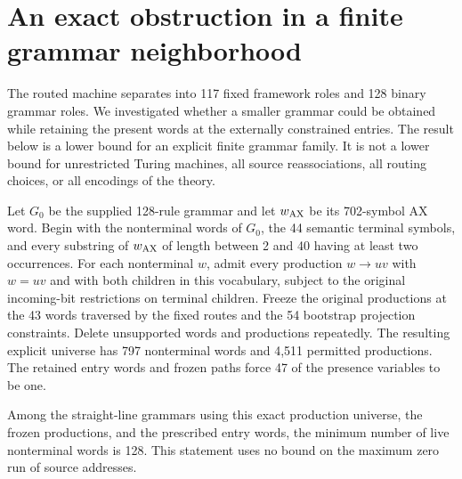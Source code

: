 \section{An exact obstruction in a finite grammar neighborhood}
\label{sec:restricted-grammar-bound}

The routed machine separates into 117 fixed framework roles and 128 binary
grammar roles. We investigated whether a smaller grammar could be obtained
while retaining the present words at the externally constrained entries.
The result below is a lower bound for an explicit finite grammar family.
It is not a lower bound for unrestricted Turing machines, all source
reassociations, all routing choices, or all encodings of the theory.

Let $G_0$ be the supplied 128-rule grammar and let $w_{\rm AX}$ be its
702-symbol AX word. Begin with the nonterminal words of $G_0$, the 44
semantic terminal symbols, and every substring of $w_{\rm AX}$ of length
between 2 and 40 having at least two occurrences. For each nonterminal
$w$, admit every production $w\to uv$ with $w=uv$ and with both children in
this vocabulary, subject to the original incoming-bit restrictions on
terminal children. Freeze the original productions at the 43 words
traversed by the fixed routes and the 54 bootstrap projection constraints.
Delete unsupported words and productions repeatedly. The resulting
explicit universe has 797 nonterminal words and 4,511 permitted
productions. The retained entry words and frozen paths force 47 of the
presence variables to be one.

\begin{theorem}
Among the straight-line grammars using this exact production universe,
the frozen productions, and the prescribed entry words, the minimum
number of live nonterminal words is 128. This statement uses no bound on
the maximum zero run of source addresses.
\end{theorem}

